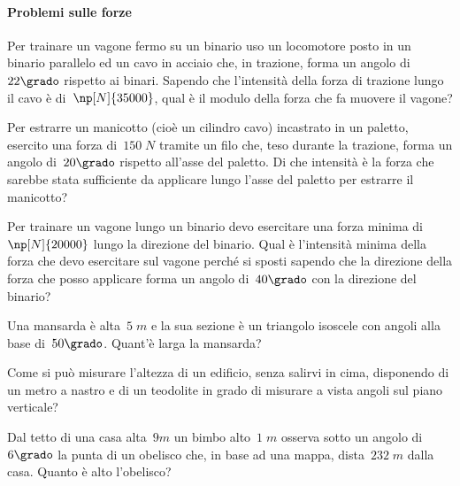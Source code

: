 \paragraph{Problemi sulle forze}

\begin{multicols}{2}
 \begin{esercizio}[\Ast]
\label{ese:G.51}
Per trainare un vagone fermo su un binario uso un locomotore posto in un binario parallelo ed un cavo in acciaio che, in trazione,
forma un angolo di~$22\grado$ rispetto ai binari. Sapendo che l'intensità della forza di trazione lungo il cavo è di~$\np[N]{35000}$,
qual è il modulo della forza che fa muovere il vagone?
\end{esercizio}

\begin{esercizio}[\Ast]
\label{ese:G.52}
Per estrarre un manicotto (cioè un cilindro cavo) incastrato in un paletto, esercito una forza di~$150\;\unit{N}$ tramite un filo che,
teso durante la trazione, forma un angolo di~$20\grado$ rispetto all'asse del paletto. Di che intensità è la forza che sarebbe stata
sufficiente da applicare lungo l'asse del paletto per estrarre il manicotto?
\end{esercizio}

\begin{esercizio}[\Ast]
\label{ese:G.53}
Per trainare un vagone lungo un binario devo esercitare una forza minima di~$\np[N]{20000}$ lungo la direzione del binario.
Qual è l'intensità minima della forza che devo esercitare sul vagone perché si sposti sapendo che la direzione della forza che posso
applicare forma un angolo di~$40\grado$ con la direzione del binario?
\end{esercizio}

\begin{esercizio}[\Ast]
\label{ese:G.54}
Una mansarda è alta~$5\;\unit{m}$ e la sua sezione è un triangolo isoscele con angoli alla base di~$50\grado$. Quant'è larga la mansarda?
\end{esercizio}

\begin{esercizio}
\label{ese:G.55}
Come si può misurare l'altezza di un edificio, senza salirvi in cima, disponendo di un metro a nastro e di un teodolite in grado di
misurare a vista angoli sul piano verticale?
\end{esercizio}

\begin{esercizio}[\Ast]
\label{ese:G.56}
Dal tetto di una casa alta~$9\unit{m}$ un bimbo alto~$1\;\unit{m}$ osserva sotto un angolo di~$6\grado$ la punta di un obelisco che,
in base ad una mappa, dista~$232\;\unit{m}$ dalla casa. Quanto è alto l'obelisco?
\end{esercizio}


\end{multicols}
